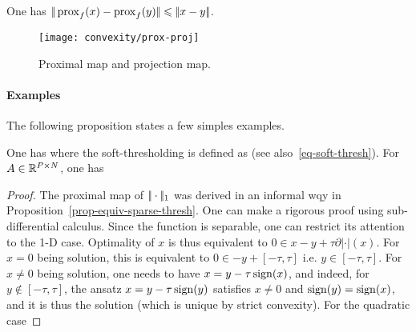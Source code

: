 \begin{prop}
	One has $|\!|  \operatorname{prox}_{f}(x)-\operatorname{prox}_{f}(y)  |\!| \leqslant |\!| x-y |\!|$.
\end{prop}



\begin{figure}
\centering
\texttt{[image: convexity/prox-proj]}
\caption{\label{fig-prox-proj}
Proximal map and projection map.}
\end{figure}


\paragraph{Examples}

The following proposition states a few simples examples.

\begin{prop}
One has
where the soft-thresholding is defined as
(see also~\eqref{eq-soft-thresh}). For $A \in \mathbb{R}^{P \times N}$, one has
\end{prop}
\begin{proof}
	The proximal map of $|\!| \cdot |\!|_1$ was derived in an informal wqy in Proposition~\ref{prop-equiv-sparse-thresh}.
	One can make a rigorous proof using sub-differential calculus. Since the function is separable, one can restrict its attention to the 1-D case. Optimality of $x$ is thus equivalent to  $0 \in x-y + \tau \partial |\cdot|(x)$.
	For $x=0$ being solution, this is equivalent to $0 \in -y + [-\tau,\tau]$ i.e. $y \in [-\tau,\tau]$.
	For $x \neq 0$ being solution, one needs to have $x = y - \tau \operatorname{sign}(x)$, and indeed, for $y \notin [-\tau,\tau]$, 
	the ansatz $x = y - \tau \operatorname{sign}(y)$ satisfies $x \neq 0$ and $\operatorname{sign}(y)=\operatorname{sign}(x)$, and it is thus the solution (which is unique by strict convexity). 
	For the quadratic case
\end{proof}


